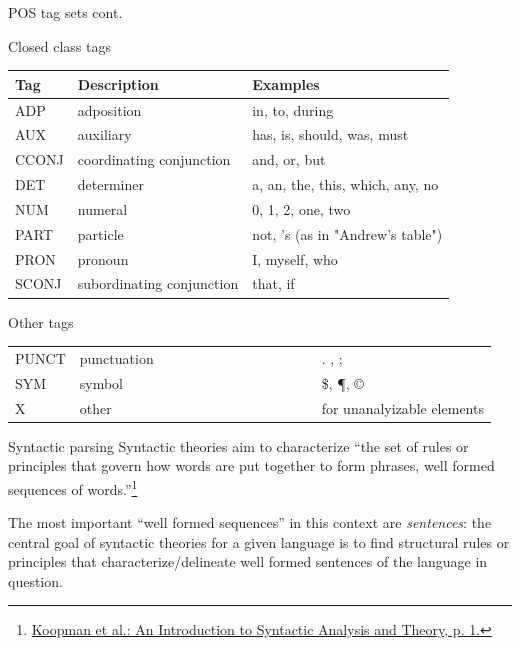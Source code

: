 \documentclass[style=upen, size=14pt]{powerdot}
\begin{document}
\begin{slide}[toc=]{POS tag sets cont.}
  \begin{center}
    \small
    {Closed class tags}\smallskip
    
    \begin{tabular}{lll}
      \hline
      Tag & Description & Examples\\
      \hline
      ADP & adposition & in, to, during\\
      AUX & auxiliary & has, is, should, was, must\\
      CCONJ & coordinating conjunction & and, or, but\\
      DET & determiner & a, an, the, this, which, any, no\\
      NUM & numeral & 0, 1, 2, one, two\\
      PART & particle & not, 's (as in "Andrew's table")\\
      PRON & pronoun & I, myself, who\\
      SCONJ & subordinating conjunction & that, if\\
    \end{tabular}
    \smallskip
    
    \small
    {Other tags}\smallskip
    
    \begin{tabular}{lll}
      PUNCT & punctuation~~~~~~~~~~~~~~~~~~~~~~ & .  ,  ;\\
      SYM & symbol & \$,  \P, \copyright \\
      X & other & for unanalyizable elements\\
    \end{tabular}
  \end{center}
\end{slide}

\begin{slide}{Syntactic parsing}
  Syntactic theories aim to characterize ``the set of rules or principles that
  govern how words are put together to form phrases, well formed sequences of
  words.''\footnote{\href{https://linguistics.ucla.edu/people/stabler/isat.pdf}{Koopman
      et al.: An Introduction to Syntactic Analysis and Theory, p. 1.}}\bigskip

  The most important ``well formed sequences'' in this context are
  \emph{sentences}: the central goal of syntactic theories for a given language
  is to find structural rules or principles that characterize/delineate well
  formed sentences of the language in question.
\end{slide}
\end{document}
